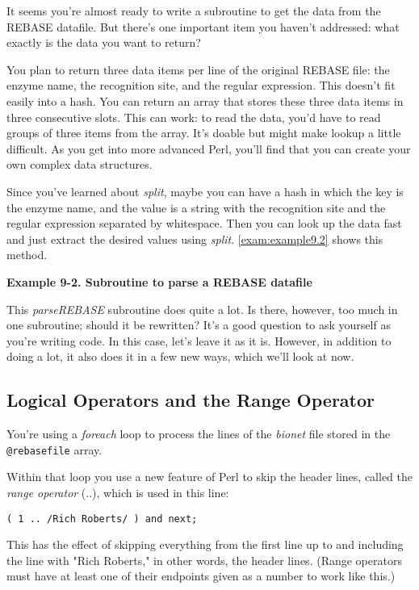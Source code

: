 It seems you're almost ready to write a subroutine to get the data from the REBASE datafile. But there's one important item you haven't addressed: what exactly is the data you want to return?

You plan to return three data items per line of the original REBASE file: the enzyme name, the recognition site, and the regular expression. This doesn't fit easily into a hash. You can return an array that stores these three data items in three consecutive slots. This can work: to read the data, you'd have to read groups of three items from the array. It's doable but might make lookup a little difficult. As you get into more advanced Perl, you'll find that you can create your own complex data structures.

Since you've learned about \textit{split}, maybe you can have a hash in which the key is the enzyme name, and the value is a string with the recognition site and the regular expression separated by whitespace. Then you can look up the data fast and just extract the desired values using \textit{split}. \autoref{exam:example9.2} shows this method. 

\textbf{Example 9-2. Subroutine to parse a REBASE datafile}


This \textit{parseREBASE} subroutine does quite a lot. Is there, however, too much in one subroutine; should it be rewritten? It's a good question to ask yourself as you're writing code. In this case, let's leave it as it is. However, in addition to doing a lot, it also does it in a few new ways, which we'll look at now. 

\subsection{Logical Operators and the Range Operator}
You're using a \textit{foreach} loop to process the lines of the \textit{bionet} file stored in the \verb|@rebasefile| array.

Within that loop you use a new feature of Perl to skip the header lines, called the \textit{range operator} (..), which is used in this line:

\begin{lstlisting}
( 1 .. /Rich Roberts/ ) and next;
\end{lstlisting}

This has the effect of skipping everything from the first line up to and including the line with "Rich Roberts," in other words, the header lines. (Range operators must have at least one of their endpoints given as a number to work like this.)

